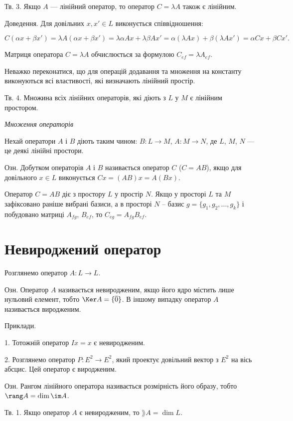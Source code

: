 Тв. 3. Якщо $A$ --- лінійний оператор, то оператор $C = \lambda A$ також є лінійним.

Доведення. Для довільних $x, x' \in L$ виконується співвідношення:

$$C(\alpha x + \beta x') = \lambda A(\alpha x + \beta x') = \lambda \alpha A x + \lambda \beta A x'
= \alpha (\lambda A x) + \beta(\lambda A x') = \alpha C x + \beta C x'.$$

Матриця оператора $C = \lambda A$ обчислюється за формулою $C_{ef} = \lambda A_{ef}$.

Неважко переконатися, що для операцій додавання та множення на константу
виконуються всі властивості, які визначають лінійний простір.


Тв. 4. Множина всіх лінійних операторів, які діють з $L$ у $M$ є лінійним
простором.


\textit{Множення операторів}


Нехай оператори $A$ і $B$ діють таким чином: $B: L \rightarrow M$, $A: M \rightarrow N$, де
$L$, $M$, $N$ --- це деякі лінійні простори.


Озн. Добутком операторів $A$ і $B$ називається оператор $C$ ($C = A B$), якщо
для довільного $x \in L$ виконується $C x = (AB)x = A(B x)$.


Оператор $C = A B$ діє з простору $L$ у простір $N$. Якщо у просторі $L$ та $M$
зафіксовано раніше вибрані базиси, а в просторі $N$ – базис $g = \{g_1, g_2, ..., g_k\}$ і
побудовано матриці $A_{fg}$, $B_{ef}$, то $C_{eg} = A_{fg} B_{ef}$. 

\section{Невироджений оператор}

Розглянемо оператор $A: L \rightarrow L$. 


Озн. Оператор $A$ називається невиродженим, якщо його ядро містить лише
нульовий елемент, тобто $\Ker A = \{\overline{0}\}$. В іншому випадку оператор $A$ називається
виродженим.


Приклади.

1. Тотожній оператор $I x = x$ є невиродженим.

2. Розглянемо оператор $P: E^2 \rightarrow E^2$, який проектує довільний вектор з $E^2$ на
вісь абсцис. Цей оператор є виродженим.


Озн. Рангом лінійного оператора називається розмірність його образу, тобто
$\rang A = \dim \im A$.


Тв. 1. Якщо оператор $A$ є невиродженим, то $\rang A = \dim L$.

